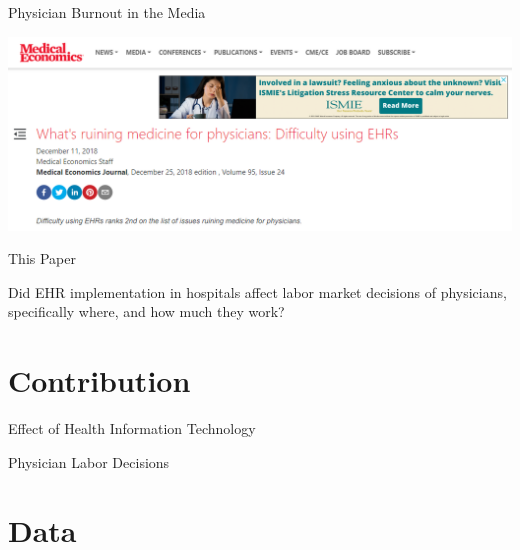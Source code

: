 \documentclass[10pt]{beamer}
\begin{document}
\begin{frame}[noframenumbering]{Physician Burnout in the Media}
\begin{center}
    \includegraphics[scale=.45]{graphics/News Clip3.PNG}
\end{center}
\end{frame}

\begin{frame}{This Paper}

Did EHR implementation in hospitals affect labor market decisions of physicians, specifically where, and how much they work?
    
\end{frame}


\section{Contribution}

\begin{frame}{Effect of Health Information Technology}
    
\end{frame}

\begin{frame}{Physician Labor Decisions}
    
\end{frame}



\section{Data}
\end{document}
